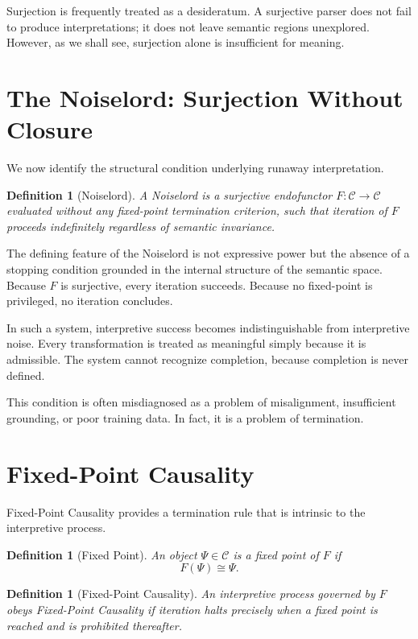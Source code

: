 \documentclass[12pt]{article}
\newtheorem{definition}[theorem]{Definition}
\theoremstyle{remark}
\begin{document}
Surjection is frequently treated as a desideratum. A surjective parser does not fail to produce interpretations; it does not leave semantic regions unexplored. However, as we shall see, surjection alone is insufficient for meaning.

\section{The Noiselord: Surjection Without Closure}

We now identify the structural condition underlying runaway interpretation.

\begin{definition}[Noiselord]
A Noiselord is a surjective endofunctor $F : \mathcal{C} \to \mathcal{C}$ evaluated without any fixed-point termination criterion, such that iteration of $F$ proceeds indefinitely regardless of semantic invariance.
\end{definition}

The defining feature of the Noiselord is not expressive power but the absence of a stopping condition grounded in the internal structure of the semantic space. Because $F$ is surjective, every iteration succeeds. Because no fixed-point is privileged, no iteration concludes.

In such a system, interpretive success becomes indistinguishable from interpretive noise. Every transformation is treated as meaningful simply because it is admissible. The system cannot recognize completion, because completion is never defined.

This condition is often misdiagnosed as a problem of misalignment, insufficient grounding, or poor training data. In fact, it is a problem of termination.

\section{Fixed-Point Causality}

Fixed-Point Causality provides a termination rule that is intrinsic to the interpretive process.

\begin{definition}[Fixed Point]
An object $\Psi \in \mathcal{C}$ is a fixed point of $F$ if
\[
F(\Psi) \cong \Psi.
\]
\end{definition}

\begin{definition}[Fixed-Point Causality]
An interpretive process governed by $F$ obeys Fixed-Point Causality if iteration halts precisely when a fixed point is reached and is prohibited thereafter.
\end{definition}
\end{document}
